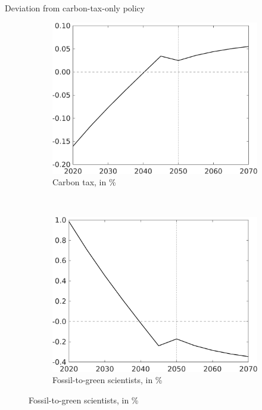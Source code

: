 \documentclass[11pt,aspectratio=169]{beamer}
\begin{document}
		\begin{frame}{Deviation from carbon-tax-only policy}
			\pause
			\centering
			\begin{figure}
				\begin{subfigure}{0.4\textwidth}
					\caption{\normalsize{Carbon tax, in \%}}
					\includegraphics[width=1\textwidth]{../codding_model/own_basedOnFried/optimalPol_010922_revision/figures/all_13Sept22_Tplus30/Tauf_OPT_T_NoTaus_COMPtaulPer_regime4_spillover0_knspil0_noskill0_sep0_xgrowth0_PV1_etaa0.79.png}
				\end{subfigure}
				\begin{minipage}[]{0.1\textwidth}
					\
				\end{minipage}
				\begin{subfigure}{0.4\textwidth}
					\caption{\normalsize{Fossil-to-green scientists,  in \% }}
					\includegraphics[width=1\textwidth]{../codding_model/own_basedOnFried/optimalPol_010922_revision/figures/all_13Sept22_Tplus30/sffsg_OPT_T_NoTaus_COMPtaulPer_regime4_spillover0_knspil0_noskill0_sep0_xgrowth0_PV1_etaa0.79.png}

\end{subfigure}
\end{figure}
\end{frame}
\end{document}
